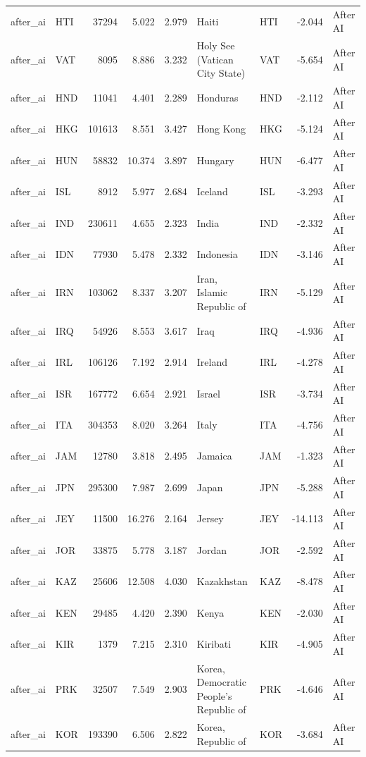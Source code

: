 \begin{tabular}{llrrrllrl}
after\_ai & HTI & 37294 & 5.022 & 2.979 & Haiti & HTI & -2.044 & After AI \\
after\_ai & VAT & 8095 & 8.886 & 3.232 & Holy See (Vatican City State) & VAT & -5.654 & After AI \\
after\_ai & HND & 11041 & 4.401 & 2.289 & Honduras & HND & -2.112 & After AI \\
after\_ai & HKG & 101613 & 8.551 & 3.427 & Hong Kong & HKG & -5.124 & After AI \\
after\_ai & HUN & 58832 & 10.374 & 3.897 & Hungary & HUN & -6.477 & After AI \\
after\_ai & ISL & 8912 & 5.977 & 2.684 & Iceland & ISL & -3.293 & After AI \\
after\_ai & IND & 230611 & 4.655 & 2.323 & India & IND & -2.332 & After AI \\
after\_ai & IDN & 77930 & 5.478 & 2.332 & Indonesia & IDN & -3.146 & After AI \\
after\_ai & IRN & 103062 & 8.337 & 3.207 & Iran, Islamic Republic of & IRN & -5.129 & After AI \\
after\_ai & IRQ & 54926 & 8.553 & 3.617 & Iraq & IRQ & -4.936 & After AI \\
after\_ai & IRL & 106126 & 7.192 & 2.914 & Ireland & IRL & -4.278 & After AI \\
after\_ai & ISR & 167772 & 6.654 & 2.921 & Israel & ISR & -3.734 & After AI \\
after\_ai & ITA & 304353 & 8.020 & 3.264 & Italy & ITA & -4.756 & After AI \\
after\_ai & JAM & 12780 & 3.818 & 2.495 & Jamaica & JAM & -1.323 & After AI \\
after\_ai & JPN & 295300 & 7.987 & 2.699 & Japan & JPN & -5.288 & After AI \\
after\_ai & JEY & 11500 & 16.276 & 2.164 & Jersey & JEY & -14.113 & After AI \\
after\_ai & JOR & 33875 & 5.778 & 3.187 & Jordan & JOR & -2.592 & After AI \\
after\_ai & KAZ & 25606 & 12.508 & 4.030 & Kazakhstan & KAZ & -8.478 & After AI \\
after\_ai & KEN & 29485 & 4.420 & 2.390 & Kenya & KEN & -2.030 & After AI \\
after\_ai & KIR & 1379 & 7.215 & 2.310 & Kiribati & KIR & -4.905 & After AI \\
after\_ai & PRK & 32507 & 7.549 & 2.903 & Korea, Democratic People's Republic of & PRK & -4.646 & After AI \\
after\_ai & KOR & 193390 & 6.506 & 2.822 & Korea, Republic of & KOR & -3.684 & After AI \\

\end{tabular}
